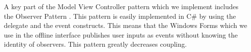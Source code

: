 \newline
A key part of the Model View Controller pattern which we implement includes the Observer Pattern \cite[p.~377]{OOAD}. This pattern is easily implemented in C\# by using the delegate and the event constructs. This means that the Windows Forms which we use in the offline interface publishes user inputs as events without knowing the identity of observers. This pattern greatly decreases coupling. \\
\newpage